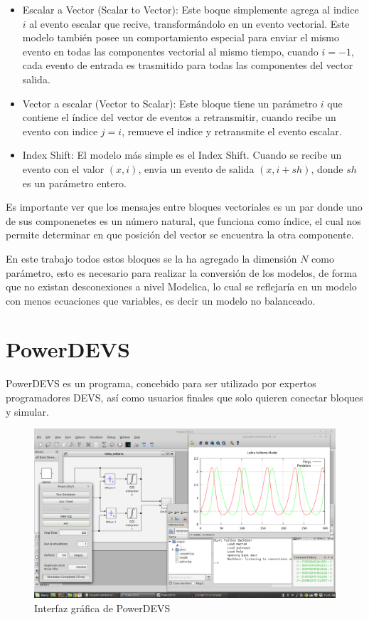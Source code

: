 	\begin{itemize}
		\item Escalar a Vector (Scalar to Vector): Este boque simplemente agrega al indice $i$ al evento escalar que recive, transformándolo en un 
			evento vectorial. Este modelo también posee un comportamiento especial para enviar el mismo evento en todas las componentes vectorial 
			al mismo tiempo, cuando $i = -1$, cada evento de entrada es trasmitido para todas las componentes del vector salida.
		\item Vector a escalar (Vector to Scalar): Este bloque tiene un parámetro $i$ que contiene el índice del vector de eventos a retransmitir, 
			cuando recibe un evento con indice $j=i$, remueve el indice y retransmite el evento escalar.
		\item Index Shift: El modelo más simple es el Index Shift. Cuando se recibe un evento con el valor $(x,i)$, envia un evento de salida $(x, i+sh)$, 
			donde $sh$ es un parámetro entero.
	\end{itemize}

	Es importante ver que los mensajes entre bloques vectoriales es un par donde uno de sus componenetes es un número natural, que funciona como índice,
	el cual nos permite determinar en que posición del vector se encuentra la otra componente.

	En este trabajo todos estos bloques se la ha agregado la dimensión $N$ como parámetro, esto es necesario para realizar la conversión de los modelos,
	 de forma que no existan desconexiones a nivel Modelica, lo cual se reflejaría en un modelo con menos ecuaciones que variables, es decir un modelo 
	no balanceado.
	 
\section{PowerDEVS}
	PowerDEVS\cite{BK11}  es un programa, concebido para ser utilizado por expertos programadores DEVS, así como usuarios finales que solo quieren conectar bloques y simular.

	\begin{figure}[!htbp]
	  \includegraphics[width=\textwidth]{powerdevs}
	  \caption{Interfaz gráfica de PowerDEVS}
	   \label{fig:powerdevsgui}
	\end{figure}

